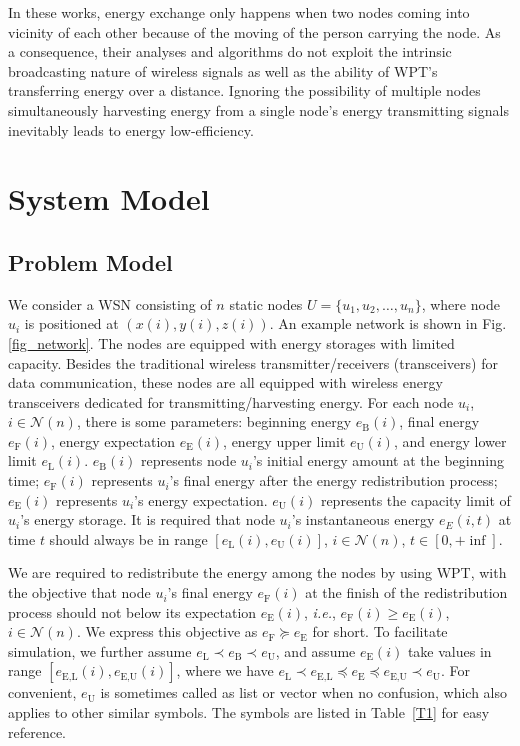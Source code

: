 \documentclass[12pt,journal,onecolumn,draftcls]{IEEEtran}
\begin{document}
In these works, energy exchange only happens when two nodes coming into vicinity of each other because of the moving of the person carrying the node. As a consequence, their analyses and algorithms do not exploit the intrinsic broadcasting nature of wireless signals as well as the ability of WPT's transferring energy over a distance. Ignoring the possibility of multiple nodes simultaneously harvesting energy from a single node's energy transmitting signals inevitably leads to energy low-efficiency.


\section{System Model}
\label{sec_model}
\subsection{Problem Model}

We consider a WSN consisting of $n$ static nodes $U{=}\{u_1, u_2, \ldots, u_n\}$, where node $u_i$ is positioned at $(x(i),y(i),z(i))$. An example network is shown in Fig.\ref{fig_network}. The nodes are equipped with energy storages with limited capacity. Besides the traditional wireless transmitter/receivers (transceivers) for data communication, these nodes are all equipped with wireless energy transceivers dedicated for transmitting/harvesting energy. For each node $u_i$, $i{\in}\mathcal{N}(n)$, there is some parameters: beginning energy $e_\text{B}(i)$, final energy $e_\text{F}(i)$, energy expectation $e_\text{E}(i)$, energy upper limit $e_\text{U}(i)$, and energy lower limit $e_\text{L}(i)$. $e_\text{B}(i)$ represents node $u_i$'s initial energy amount at the beginning time; $e_\text{F}(i)$ represents $u_i$'s final energy after the energy redistribution process; $e_\text{E}(i)$ represents $u_i$'s energy expectation. $e_\text{U}(i)$ represents the capacity limit of $u_i$'s energy storage. It is required that node $u_i$'s instantaneous energy $e_{E}(i,t)$ at time $t$ should always be in range $[e_\text{L}(i),e_\text{U}(i)]$, $i{\in}\mathcal{N}(n)$, $t{\in}[0,{+}\inf]$.

We are required to redistribute the energy among the nodes by using WPT, with the objective that node $u_i$'s final energy $e_\text{F}(i)$ at the finish of the redistribution process should not below its expectation $e_\text{E}(i)$, \textit{i.e.}, $e_\text{F}(i){\geq}e_\text{E}(i)$, $i{\in}\mathcal{N}(n)$. We express this objective as $e_\text{F}{\succeq}e_\text{E}$ for short. To facilitate simulation, we further assume $e_\text{L}{\prec}e_\text{B}{\prec}e_\text{U}$, and assume $e_\text{E}(i)$ take values in range $[e_\text{E,L}(i),e_\text{E,U}(i)]$, where we have $e_\text{L}{\prec}e_\text{E,L}{\preceq}e_\text{E}{\preceq}e_\text{E,U}{\prec}e_\text{U}$. For convenient, $e_\text{U}$ is sometimes called as list or vector when no confusion, which also applies to other similar symbols. The symbols are listed in Table~\ref{T1} for easy reference.
\end{document}
